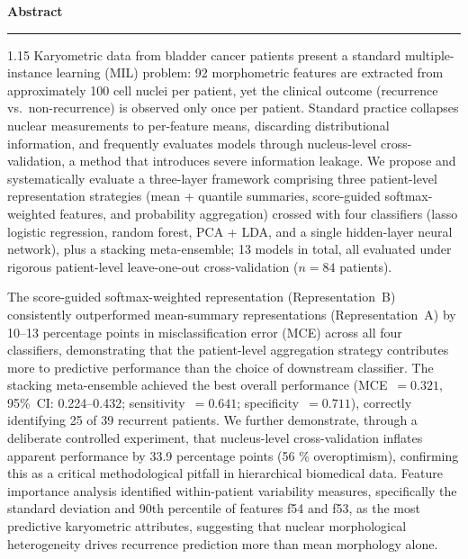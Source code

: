 \documentclass[12pt, onecolumn]{article}
\begin{document}
\begin{center}
{\large\bfseries\color{navyblue} Abstract}
\end{center}

\vspace{0.5em}
\noindent\rule{\textwidth}{0.4pt}
\vspace{0.5em}

\begin{spacing}{1.15}
\noindent
Karyometric data from bladder cancer patients present a standard multiple-instance learning (MIL) problem: 92 morphometric features are extracted from approximately 100 cell nuclei per patient, yet
the clinical outcome (recurrence vs.\ non-recurrence) is observed only once per patient. Standard practice collapses nuclear measurements to per-feature means, discarding distributional information, and frequently evaluates models through nucleus-level cross-validation, a method that introduces severe information
leakage. We propose and systematically evaluate a three-layer framework comprising three patient-level representation strategies (mean + quantile summaries, score-guided softmax-weighted features, and probability aggregation) crossed with four classifiers (lasso logistic regression, random forest, PCA + LDA, and a single hidden-layer neural network), plus a stacking meta-ensemble; 13 models in total, all evaluated under rigorous patient-level
leave-one-out cross-validation ($n = 84$ patients).

The score-guided softmax-weighted representation (Representation~B) consistently outperformed mean-summary representations (Representation~A) by 10--13 percentage points in misclassification error (MCE) across all four classifiers, demonstrating that the patient-level aggregation strategy contributes more to predictive performance than the choice of downstream classifier. The stacking meta-ensemble achieved the best overall performance (MCE~$= 0.321$,
95\%~CI: 0.224--0.432; sensitivity~$= 0.641$; specificity~$= 0.711$), correctly identifying 25 of 39 recurrent patients. We further demonstrate, through a deliberate controlled experiment, that nucleus-level cross-validation inflates apparent performance by 33.9 percentage points (56 \% overoptimism), confirming this as a critical methodological pitfall in hierarchical biomedical data. Feature
importance analysis identified within-patient variability measures, specifically the standard deviation and 90th percentile of features f54 and f53, as the most predictive karyometric attributes, suggesting that nuclear morphological heterogeneity
drives recurrence prediction more than mean morphology alone.
\end{spacing}
\end{document}
